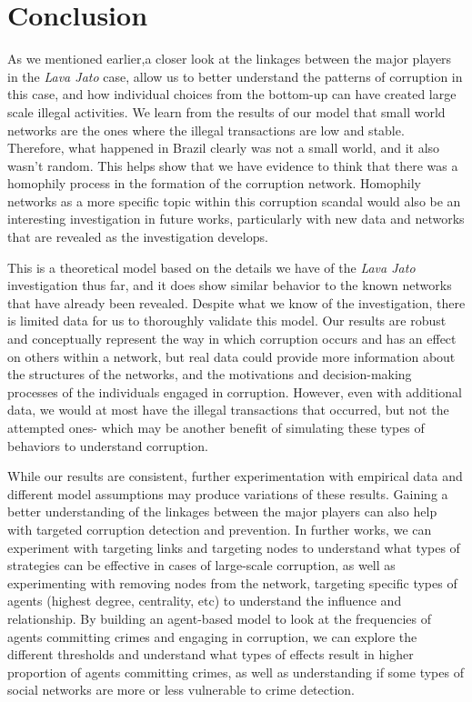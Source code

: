 \documentclass[letterpaper, 11pt]{article}
\begin{document}
\section{Conclusion}
\label{sec:org5c5327f}
As we mentioned earlier,a closer look at the linkages between the major players in the \emph{Lava Jato} case, allow us to better understand the patterns of corruption in this case, and how individual choices from the bottom-up can have created large scale illegal activities. We learn from the results of our model that small world networks are the ones where the illegal transactions are low and stable. Therefore, what happened in Brazil clearly was not a small world, and it also wasn’t random. This helps show that we have evidence to think that there was a homophily process in the formation of the corruption network. Homophily networks as a more specific topic within this corruption scandal would also be an interesting investigation in future works, particularly with  new data and networks that are revealed as the investigation develops.

This is a theoretical model based on the details we have of the \emph{Lava Jato} investigation thus far, and it does show similar behavior to the known networks that have already been revealed. Despite what we know of the investigation, there is limited data for us to thoroughly validate this model. Our results are robust and conceptually represent the way in which corruption occurs and has an effect on others within a network, but real data could provide more information about the structures of the networks, and the motivations and decision-making processes of the individuals engaged in corruption. However, even with additional data, we would at most have the illegal transactions that occurred, but not the attempted ones- which may be another benefit of simulating these types of behaviors to understand corruption. 

While our results are consistent, further experimentation with empirical data and different model assumptions may produce variations of these results. Gaining a better understanding of the linkages between the major players can also help with targeted corruption detection and prevention. In further works, we can experiment with targeting links and targeting nodes to understand what types of strategies can be effective in cases of large-scale corruption, as well as experimenting with removing nodes from the network, targeting specific types of agents (highest degree, centrality, etc) to understand the influence and relationship. By building an agent-based model to look at the frequencies of agents committing crimes and engaging in corruption, we can explore the different thresholds and understand what types of effects result in higher proportion of agents committing crimes, as well as understanding if some types of social networks are more or less vulnerable to crime detection. 
\end{document}
